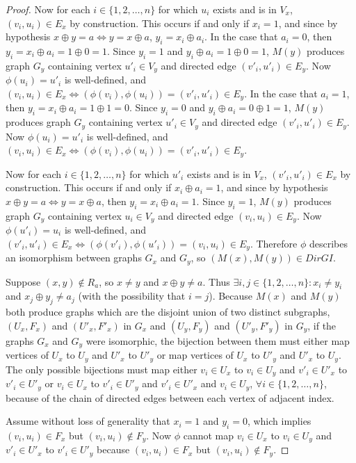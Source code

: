 \documentclass[draft]{article}
\theoremstyle{definition}
\begin{document}
\begin{proof}
  Now for each $i\in\{1, 2, \ldots, n\}$ for which $u_i$ exists and is in
  $V_x$, $(v_i, u_i)\in E_x$ by construction. This occurs if and only if
  $x_i=1$, and since by hypothesis $x\oplus y=a \iff y=x\oplus a$,
  $y_i=x_i\oplus a_i$. In the case that $a_i=0$, then $y_i=x_i\oplus a_i=
  1\oplus 0=1$. Since $y_i=1$ and $y_i\oplus a_i=1\oplus 0=1$, $M(y)$ produces
  graph $G_y$ containing vertex $u'_i\in V_y$ and directed edge $(v'_i,
  u'_i)\in E_y$. Now $\phi(u_i)=u'_i$ is well-defined, and $(v_i, u_i)\in
  E_x\iff (\phi(v_i), \phi(u_i))=(v'_i, u'_i)\in E_y$. In the case that
  $a_i=1$, then $y_i=x_i\oplus a_i=1\oplus1=0$. Since $y_i=0$ and $y_i\oplus
  a_i=0\oplus 1=1$, $M(y)$ produces graph $G_y$ containing vertex $u'_i\in V_y$
  and directed edge $(v'_i, u'_i)\in E_y$. Now $\phi(u_i)=u'_i$ is
  well-defined, and $(v_i, u_i)\in E_x\iff (\phi(v_i), \phi(u_i))=(v'_i,
  u'_i)\in E_y$.

  Now for each $i\in\{1, 2, \ldots, n\}$ for which $u'_i$ exists and is in
  $V_x$, $(v'_i, u'_i)\in E_x$ by construction. This occurs if and only if
  $x_i\oplus a_i=1$, and since by hypothesis $x\oplus y=a \iff y=x\oplus a$,
  then $y_i=x_i\oplus a_i=1$. Since $y_i=1$, $M(y)$ produces graph $G_y$
  containing vertex $u_i\in V_y$ and directed edge $(v_i, u_i)\in E_y$. Now
  $\phi(u'_i)=u_i$ is well-defined, and $(v'_i, u'_i)\in E_x\iff (\phi(v'_i),
  \phi(u'_i))=(v_i, u_i)\in E_y$. Therefore $\phi$ describes an isomorphism
  between graphs $G_x$ and $G_y$, so $(M(x),M(y))\in DirGI$.

  Suppose $(x, y)\notin R_a$, so $x\neq y$ and $x\oplus y\neq a$. Thus $\exists
  i,j\in\{1, 2, \ldots, n\}: x_i\neq y_i$ and $x_j\oplus y_j\neq a_j$ (with the
  possibility that $i=j$). Because $M(x)$ and $M(y)$ both produce graphs which
  are the disjoint union of two distinct subgraphs, $(U_x, F_x)$ and $(U'_x,
  F'_x)$ in $G_x$ and $(U_y, F_y)$ and $(U'_y, F'_y)$ in $G_y$, if the graphs
  $G_x$ and $G_y$ were isomorphic, the bijection between them must either map
  vertices of $U_x$ to $U_y$ and $U'_x$ to $U'_y$ or map vertices of $U_x$ to
  $U'_y$ and $U'_x$ to $U_y$. The only possible bijections must map either
  $v_i\in U_x$ to $v_i\in U_y$ and $v'_i\in U'_x$ to $v'_i\in U'_y$ or $v_i\in
  U_x$ to $v'_i\in U'_y$ and $v'_i\in U'_x$ and $v_i\in U_y$, $\forall i\in\{1,
  2, \ldots, n\}$, because of the chain of directed edges between each vertex
  of adjacent index.

  Assume without loss of generality that $x_i=1$ and $y_i=0$, which implies
  $(v_i, u_i)\in F_x$ but $(v_i, u_i)\notin F_y$. Now $\phi$ cannot map $v_i\in
  U_x$ to $v_i\in U_y$ and $v'_i\in U'_x$ to $v'_i\in U'_y$ because $(v_i,
  u_i)\in F_x$ but $(v_i, u_i)\notin F_y$. 


\end{proof}
\end{document}
